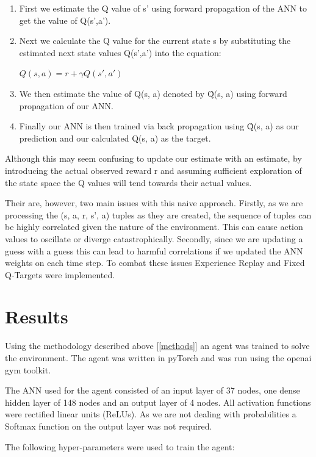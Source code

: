 \documentclass[12pt]{article}
\begin{document}
\begin{enumerate}
	\item First we estimate the Q value of s' using forward propagation of the ANN to get the value of Q(s',a').
	\item Next we calculate the Q value for the current state s by substituting the estimated next state values Q(s',a') 
			into the equation:
	\begin{center}
		$Q(s,a) = r+\gamma Q(s',a') $
	\end{center}
	\item We then estimate the value of Q(s, a) denoted by \^Q(s, a) using forward propagation of our ANN.
	\item Finally our ANN is then trained via back propagation using  \^Q(s, a) as our prediction and our calculated Q(s, a) as the target.
\end{enumerate}

Although this may seem confusing to update our estimate with an estimate, by introducing the actual observed reward r 
and assuming sufficient exploration of the state space the Q values will tend towards their actual values.

Their are, however, two main issues with this naive approach. 
Firstly, as we are processing the (s, a, r, s', a) tuples as they are created, the sequence of tuples can be highly correlated
given the nature of the environment.
This can cause action values to oscillate or diverge catastrophically.
Secondly, since we are updating a guess with a guess this can lead to harmful correlations if we updated the ANN weights on each time step.
To combat these issues Experience Replay\cite{experience_replay} and Fixed Q-Targets\cite{deep_q_networks} were implemented.

\section{Results}

Using the methodology described above [\ref{methods}] an agent was trained to solve the environment.
The agent was written in pyTorch and was run using the openai gym toolkit.

The ANN used for the agent consisted of an input layer of 37 nodes, one dense hidden layer of 148 nodes and an output layer of 4 nodes.
All activation functions were rectified linear units (ReLUs). 
As we are not dealing with probabilities a Softmax function on the output layer was not required.

The following hyper-parameters were used to train the agent:
\end{document}
